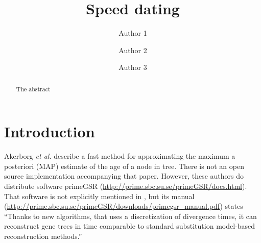 \documentclass{llncs}
\newcommand{\etal}[0]{{\em et al.}\xspace}
\begin{document}
\title{Speed dating}
\author{Author 1 \and Author 2 \and Author 3}
\newcommand\enum{\addtocounter{equation}{1}\tag{\theequation}}
\maketitle              %
\begin{abstract} The abstract \end{abstract}
\section {Introduction}
Akerborg \etal \cite{Akerborg2008} describe a fast method for approximating
the maximum a posteriori (MAP) estimate of the age of a node in tree.
There is not an open source implementation accompanying that paper.
However, these authors do distribute software primeGSR
(\url{http://prime.sbc.su.se/primeGSR/docs.html}).
That software is not explicitly mentioned in \cite{Akerborg2008}, but its manual
(\url{http://prime.sbc.su.se/primeGSR/downloads/primegsr_manual.pdf})
states ``Thanks to
new algorithms, that uses a discretization of divergence times, it can reconstruct gene trees
in time comparable to standard substitution model-based reconstruction methods.''
\end{document}
